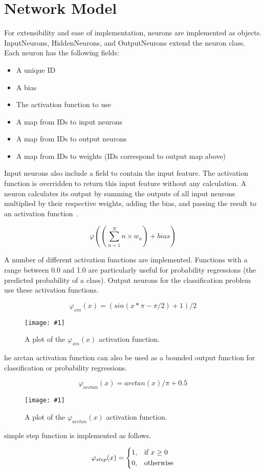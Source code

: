 \documentclass[twocolumn]{article}
\newcommand\fig[5]{
	\begin{figure}[H]
		\begin{center}\texttt{[image: \#1]}\end{center}
		\caption{#4}\label{fig:#2}
	\end{figure}
}
\begin{document}
\section{Network Model}
For extensibility and ease of implementation, neurons are implemented as objects. InputNeurons, HiddenNeurons, and OutputNeurons extend the neuron class. Each neuron has the following fields:

\begin{itemize}
	\item A unique ID 
	\item A bias
	\item The activation function to use
	\item A map from IDs to input neurons
	\item A map from IDs to output neurons
 	\item A map from IDs to weights (IDs correspond to output map above)
\end{itemize}

Input neurons also include a field to contain the input feature. The activation function is overridden to return this input feature without any calculation. A neuron calculates its output by summing the outputs of all input neurons multiplied by their respective weights, adding the bias, and passing the result to an activation function~\cite{Russell:2003:AIM:773294}. 

$$\varphi((\sum_{n=1}^{N}n \times w_n)+bias)$$

A number of different activation functions are implemented. Functions with a range between 0.0 and 1.0 are particularly useful for probability regressions (the predicted probability of a class). Output neurons for the classification problem use these activation functions. 

$$\varphi_{sin}(x) = (sin(x*\pi-\pi/2)+1)/2$$

\fig{images/sin.png}{sinact}{0.5}{
A plot of the $\varphi_{sin}(x)$ activation function.
}

The arctan activation function can also be used as a bounded output function for classification or probability regressions.

$$\varphi_{arctan}(x) = arctan(x)/\pi+0.5$$

\fig{images/tan.png}{tanact}{0.5}{
A plot of the $\varphi_{arctan}(x)$ activation function.
}

A simple step function is implemented as follows.

\[
\varphi_{step}(x) =  
\begin{dcases}
    1,& \text{if } x\geq 0\\
    0,              & \text{otherwise}
\end{dcases}
\]
\end{document}
